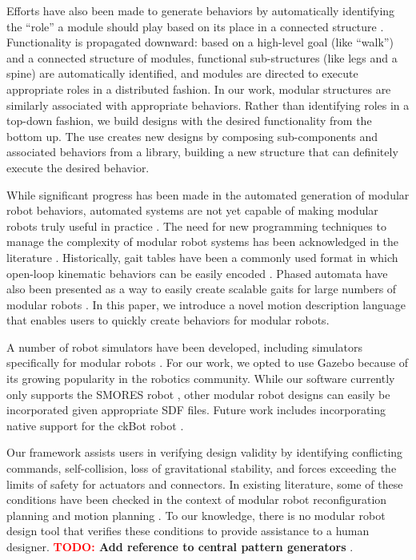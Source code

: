\documentclass[graybox]{svmult}
\newcommand{\TODO}[1]{ {\bf \textcolor{red}{TODO:} #1 }}
\begin{document}
Efforts have also been made to generate behaviors by automatically identifying the ``role'' a module should play based on its place in a connected structure \cite{stoy2002using}.  Functionality is propagated downward: based on a high-level goal (like ``walk'') and a connected structure of modules, functional sub-structures (like legs and a spine) are automatically identified, and modules are directed to execute appropriate roles in a distributed fashion.  In our work, modular structures are similarly associated with appropriate behaviors. Rather than identifying roles in a top-down fashion, we build designs with the desired functionality from the bottom up. The use creates new designs by composing sub-components and associated behaviors from a library, building a new structure that can definitely execute the desired behavior.

While significant progress has been made in the automated generation of modular
robot behaviors, automated systems are not yet capable of making modular robots
truly useful in practice \cite{yim2007modular}.  The need for new programming
techniques to manage the complexity of modular robot systems has been
acknowledged in the literature \cite{yim2000modular}. Historically, gait tables
have been a commonly used format in which open-loop kinematic behaviors can be
easily encoded \cite{yim1994locomotion}. Phased automata have also been
presented as a way to easily create scalable gaits for large numbers of modular
robots \cite{zhang2003phase}. In this paper, we introduce a novel motion
description language that enables users to quickly create behaviors for modular
robots.

A number of robot simulators have been developed, including simulators specifically for modular robots \cite{christensen2008unified}. For our work, we opted to use Gazebo \cite{koenig2004design} because of its growing popularity in the robotics community. While our software currently only supports the SMORES robot \cite{Davey2012}, other modular robot designs can easily be incorporated given appropriate SDF files. Future work includes incorporating native support for the ckBot robot \cite{davey2012modlock}.

Our framework assists users in verifying design validity by identifying conflicting
commands, self-collision, loss of gravitational stability, and forces 
exceeding the limits of safety for actuators and connectors. In existing literature, some
of these
conditions have been checked in the context of modular robot reconfiguration
planning \cite{casal2001reconfiguration} and motion planning
\cite{yoshida2002self}. To our knowledge, there is no modular robot design tool
that verifies these conditions to provide assistance to a human designer.
\TODO{Add reference to central pattern generators}.
\end{document}
